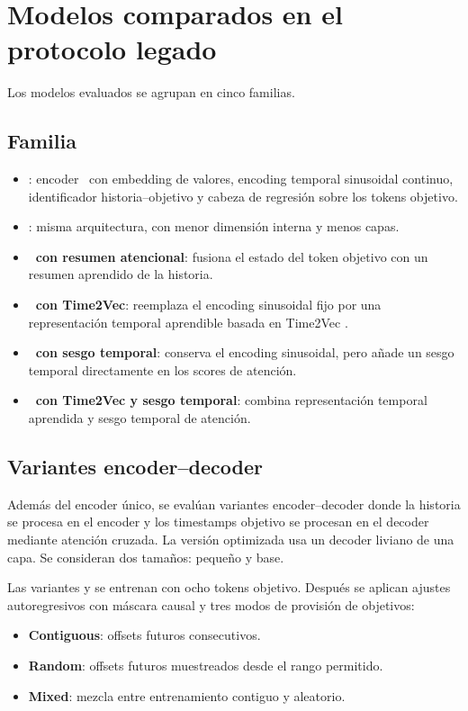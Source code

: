 \section{Modelos comparados en el protocolo legado}
\label{sec:modelos-comparados}

Los modelos evaluados se agrupan en cinco familias.

\subsection{Familia \CTTransformer}

\begin{itemize}
	\item \textbf{\CTTransformerBase}: encoder \Transformer\ con embedding de valores, encoding temporal sinusoidal continuo, identificador historia--objetivo y cabeza de regresión sobre los tokens objetivo.
	\item \textbf{\CTTransformerSmall}: misma arquitectura, con menor dimensión interna y menos capas.
	\item \textbf{\CTTransformer\ con resumen atencional}: fusiona el estado del token objetivo con un resumen aprendido de la historia.
	\item \textbf{\CTTransformer\ con Time2Vec}: reemplaza el encoding sinusoidal fijo por una representación temporal aprendible basada en Time2Vec \cite{kazemi2019time2vec}.
	\item \textbf{\CTTransformer\ con sesgo temporal}: conserva el encoding sinusoidal, pero añade un sesgo temporal directamente en los scores de atención.
	\item \textbf{\CTTransformer\ con Time2Vec y sesgo temporal}: combina representación temporal aprendida y sesgo temporal de atención.
\end{itemize}

\subsection{Variantes encoder--decoder}

Además del encoder único, se evalúan variantes encoder--decoder donde la historia se procesa en el encoder y los timestamps objetivo se procesan en el decoder mediante atención cruzada. La versión optimizada usa un decoder liviano de una capa. Se consideran dos tamaños: pequeño y base.

\hfill

Las variantes  y  se entrenan con ocho tokens objetivo. Después se aplican ajustes autoregresivos con máscara causal y tres modos de provisión de objetivos:
\begin{itemize}
	\item \textbf{Contiguous}: offsets futuros consecutivos.
	\item \textbf{Random}: offsets futuros muestreados desde el rango permitido.
	\item \textbf{Mixed}: mezcla entre entrenamiento contiguo y aleatorio.
\end{itemize}

